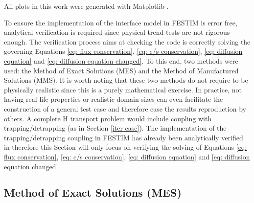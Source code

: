 All plots in this work were generated with Matplotlib .





To ensure the implementation of the interface model in FESTIM is error free, analytical verification is required since physical trend tests are not rigorous enough. The verification process aims at checking the code is correctly solving the governing Equations \ref{eq: flux conservation}, \ref{eq: c/s conservation}, \ref{eq: diffusion equation} and \ref{eq: diffusion equation changed}.
To this end, two methods were used: the Method of Exact Solutions (MES) and the Method of Manufactured Solutions (MMS).
It is worth noting that these two methods do not require to be physically realistic since this is a purely mathematical exercise.
In practice, not having real life properties or realistic domain sizes can even facilitate the construction of a general test case and therefore ease the results reproduction by others.
A complete H transport problem would include coupling with trapping/detrapping (as in Section \ref{iter case}).
The implementation of the trapping/detrapping coupling in FESTIM has already been analytically verified in  therefore this Section will only focus on verifying the solving of Equations \ref{eq: flux conservation}, \ref{eq: c/s conservation}, \ref{eq: diffusion equation} and \ref{eq: diffusion equation changed}.

\subsection{Method of Exact Solutions (MES)}

